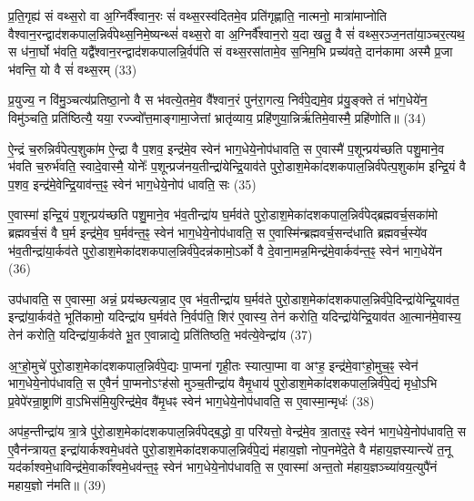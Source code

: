 प्र॒ति॒गृह्य॑ सं वथ्स॒रो वा अ॒ग्निर्वै᳚श्वान॒रः सं॑ वथ्स॒रस्व॑दितमे॒व प्रति॑गृह्णाति॒ नात्मनो॒ मात्रा॑माप्नोति वैश्वान॒रन्द्वाद॑शकपाल॒न्निर्व॑पेथ्स॒निमे॒ष्यन्थ्सं॑ वथ्स॒रो वा अ॒ग्निर्वै᳚श्वान॒रो य॒दा खलु॒ वै सं॑ वथ्स॒रञ्ज॒नता॑या॒ञ्चर॒त्यथ॒ स ध॑ना॒र्घो भ॑वति॒ यद्वै᳚श्वान॒रन्द्वाद॑शकपालन्नि॒र्वप॑ति सं वथ्स॒रसा॑तामे॒व स॒निम॒भि प्रच्य॑वते॒ दान॑कामा अस्मै प्र॒जा भ॑वन्ति॒ यो वै सं॑ वथ्स॒रम् (33)

प्र॒युज्य॒ न वि॑मु॒ञ्चत्य॑प्रतिष्ठा॒नो वै स भ॑वत्ये॒तमे॒व वै᳚श्वान॒रं पुन॑रा॒गत्य॒ निर्व॑पे॒द्यमे॒व प्र॑यु॒ङ्क्ते तं भा॑ग॒धेये॑न॒ विमु॑ञ्चति॒ प्रति॑ष्ठित्यै॒ यया॒ रज्ज्वो᳚त्त॒माङ्गामा॒जेत्तां भ्रातृ॑व्याय॒ प्रहि॑णुया॒न्निर्\mbox{}ऋ॑तिमे॒वास्मै॒ प्रहि॑णोति॥ (34)

{\anuvakamend{नि॒र्व॒रु॒णं व॑पेदुभ॒याद॒द्यो वै सं॑ वथ्स॒रꣳ षट्त्रिꣳ॑शच्च।\scriptsize  (6)]}}

ऐ॒न्द्रं च॒रुन्निर्व॑पेत्प॒शुका॑म ऐ॒न्द्रा वै प॒शव॒ इन्द्र॑मे॒व स्वेन॑ भाग॒धेये॒नोप॑धावति॒ स ए॒वास्मै॑ प॒शून्प्रय॑च्छति पशु॒माने॒व भ॑वति च॒रुर्भ॑वति॒ स्वादे॒वास्मै॒ योनेः᳚ प॒शून्प्रज॑नय॒तीन्द्रा॑येन्द्रि॒याव॑ते पुरो॒डाश॒मेका॑दशकपाल॒न्निर्व॑पेत्प॒शुका॑म इन्द्रि॒यं वै प॒शव॒ इन्द्र॑मे॒वेन्द्रि॒याव॑न्त॒ꣴ॒ स्वेन॑ भाग॒धेये॒नोप॑ धावति॒ सः (35)

ए॒वास्मा॑ इन्द्रि॒यं प॒शून्प्रय॑च्छति पशु॒माने॒व भ॑व॒तीन्द्रा॑य घ॒र्मव॑ते पुरो॒डाश॒मेका॑दशकपाल॒न्निर्व॑पेद्ब्रह्मवर्च॒सका॑मो ब्रह्मवर्च॒सं वै घ॒र्म इन्द्र॑मे॒व घ॒र्मव॑न्त॒ꣴ॒ स्वेन॑ भाग॒धेये॒नोप॑धावति॒ स ए॒वास्मि॑न्ब्रह्मवर्च॒सन्द॑धाति ब्रह्मवर्च॒स्ये॑व भ॑व॒तीन्द्रा॑या॒र्कव॑ते पुरो॒डाश॒मेका॑दशकपाल॒न्निर्व॑पे॒दन्न॑कामो॒\-ऽर्को वै दे॒वाना॒मन्न॒मिन्द्र॑मे॒वार्कव॑न्त॒ꣴ॒ स्वेन॑ भाग॒धेये॑न (36)

उप॑धावति॒ स ए॒वास्मा॒ अन्नं॒ प्रय॑च्छत्यन्ना॒द ए॒व भ॑व॒तीन्द्रा॑य घ॒र्मव॑ते पुरो॒डाश॒मेका॑दशकपाल॒न्निर्व॑पे॒दिन्द्रा॑येन्द्रि॒याव॑त॒ इन्द्रा॑या॒र्कव॑ते॒ भूति॑कामो॒ यदिन्द्रा॑य घ॒र्मव॑ते नि॒र्वप॑ति॒ शिर॑ ए॒वास्य॒ तेन॑ करोति॒ यदिन्द्रा॑येन्द्रि॒याव॑त आ॒त्मान॑मे॒वास्य॒ तेन॑ करोति॒ यदिन्द्रा॑या॒र्कव॑ते भू॒त ए॒वान्नाद्ये॒ प्रति॑तिष्ठति॒ भव॑त्ये॒वेन्द्रा॑य (37)

अ॒ꣳ॒हो॒मुचे॑ पुरो॒डाश॒मेका॑दशकपाल॒न्निर्व॑पे॒द्यः पा॒प्मना॑ गृही॒तः स्यात्पा॒प्मा वा अꣳह॒ इन्द्र॑मे॒वाꣳहो॒मुच॒ꣴ॒ स्वेन॑ भाग॒धेये॒नोप॑धावति॒ स ए॒वैनं॑ पा॒प्मनो\-ऽꣳह॑सो मुञ्च॒तीन्द्रा॑य वैमृ॒धाय॑ पुरो॒डाश॒मेका॑दशकपाल॒न्निर्व॑पे॒द्यं मृधो॒\-ऽभि प्र॒वेपे॑रन्रा॒ष्ट्राणि॑ वा॒\-ऽभिस॑मि॒युरिन्द्र॑मे॒व वै॑मृ॒धꣴ स्वेन॑ भाग॒धेये॒नोप॑धावति॒ स ए॒वास्मा॒न्मृधः॑ (38)

अप॑ह॒न्तीन्द्रा॑य त्रा॒त्रे पु॑रो॒डाश॒मेका॑दशकपाल॒न्निर्व॑पेद्ब॒द्धो वा॒ परि॑यत्तो॒ वेन्द्र॑मे॒व त्रा॒तार॒ꣴ॒ स्वेन॑ भाग॒धेये॒नोप॑धावति॒ स ए॒वैन॑न्त्रायत॒ इन्द्रा॑यार्कश्वमे॒धव॑ते पुरो॒डाश॒मेका॑दशकपाल॒न्निर्व॑पे॒द्यं म॑हाय॒ज्ञो नोप॒नमे॑दे॒ते वै म॑हाय॒ज्ञस्यान्त्ये॑ त॒नू यद॑र्काश्वमे॒धाविन्द्र॑मे॒वार्का᳚श्वमे॒धव॑न्त॒ꣴ॒ स्वेन॑ भाग॒धेये॒नोप॑धावति॒ स ए॒वास्मा॑ अन्त॒तो म॑हाय॒ज्ञञ्च्या॑वय॒त्युपै॑नं महाय॒ज्ञो न॑मति॥ (39)

